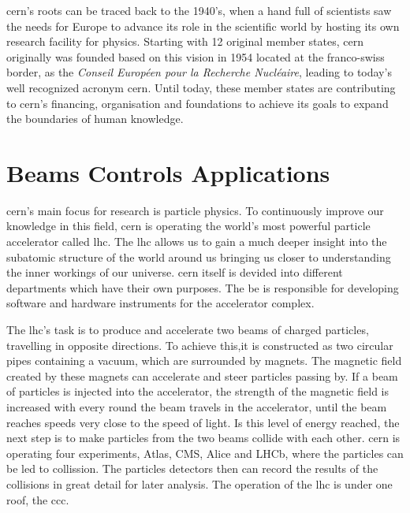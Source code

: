 \gls{cern}'s roots can be traced back to the 1940's, when a hand full of scientists saw the needs for Europe to advance its role in the scientific world by hosting its own research facility for physics. Starting with 12 original member states, \gls{cern} originally was founded based on this vision in 1954 located at the franco-swiss border, as the \emph{Conseil Européen pour la Recherche Nucléaire}, leading to today's well recognized acronym \gls{cern}. Until today, these member states are contributing to \gls{cern}'s financing, organisation and foundations to achieve its goals to expand the boundaries of human knowledge. \cite{CernOurHistory}

\section{Beams Controls Applications}
\label{sec:Introduction:BE-CO-APS}

\gls{cern}'s main focus for research is particle physics. To continuously improve our knowledge in this field, \gls{cern} is operating the world's most powerful particle accelerator called \gls{lhc}. The \gls{lhc} allows us to gain a much deeper insight into the subatomic structure of the world around us bringing us closer to understanding the inner workings of our universe. \gls{cern} itself is devided into different departments which have their own purposes. The \gls{be} is responsible for developing software and hardware instruments for the accelerator complex. \cite{CernBeamsDep}

The \gls{lhc}'s task is to produce and accelerate two beams of charged particles, travelling in opposite directions. To achieve this,it is constructed as two circular pipes containing a vacuum, which are surrounded by magnets. The magnetic field created by these magnets can accelerate and steer particles passing by. If a beam of particles is injected into the accelerator, the strength of the magnetic field is increased with every round the beam travels in the accelerator, until the beam reaches speeds very close to the speed of light. Is this level of energy reached, the next step is to make particles from the two beams collide with each other. \gls{cern} is operating four experiments, Atlas, CMS, Alice and LHCb, where the particles can be led to collission. The particles detectors then can record the results of the collisions in great detail for later analysis. The operation of the \gls{lhc} is under one roof, the \gls{ccc}. \cite{CernLhc, HowParticleAccsWork}



